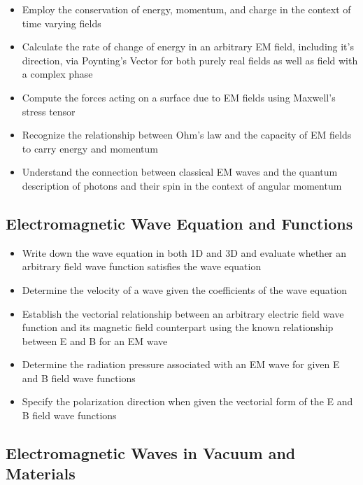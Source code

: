 \documentclass[12pt]{article}
\begin{document}
\begin{itemize}
  \item Employ the conservation of energy, momentum, and charge in the context of time varying fields
  \item Calculate the rate of change of energy in an arbitrary EM field, including it's direction, via Poynting's Vector for both purely real fields as well as field with a complex phase
  \item Compute the forces acting on a surface due to EM fields using Maxwell's stress tensor
  \item Recognize the relationship between Ohm's law and the capacity of EM fields to carry energy and momentum
  \item Understand the connection between classical EM waves and the quantum description of photons and their spin in the context of angular momentum
\end{itemize}

\subsection*{Electromagnetic Wave Equation and Functions}

\begin{itemize}
  \item Write down the wave equation in both 1D and 3D and evaluate whether an arbitrary field wave function satisfies the wave equation
  \item Determine the velocity of a wave given the coefficients of the wave equation
  \item Establish the vectorial relationship between an arbitrary electric field wave function and its magnetic field counterpart using the known relationship between E and B for an EM wave
  \item Determine the radiation pressure associated with an EM wave for given E and B field wave functions
  \item Specify the polarization direction when given the vectorial form of the E and B field wave functions
\end{itemize}

\subsection*{Electromagnetic Waves in Vacuum and Materials}
\end{document}
